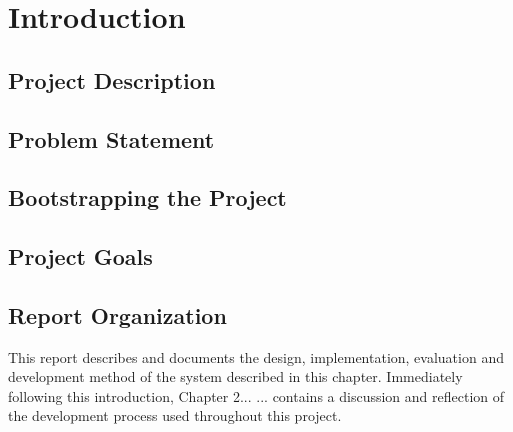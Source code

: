 \chapter{Introduction}
\dummy

\section{Project Description}
\dummy
{}

\section{Problem Statement}
\dummy

\section{Bootstrapping the Project}
\dummy

\section{Project Goals}
\dummy
{}

\section{Report Organization}
This report describes and documents the design, implementation, evaluation and development method of the system described in this chapter. Immediately following this introduction, Chapter 2... \dummy ...  contains a discussion and reflection of the development process used throughout this project.